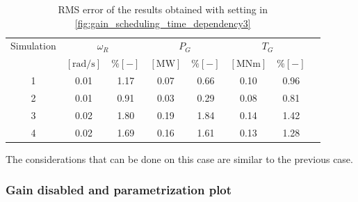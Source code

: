 \begin{table}[htb]
  \caption{RMS error of the results obtained with setting in \autoref{fig:gain_scheduling_time_dependency3}}
  \centering
  \begin{tabular}{cccccccc}
    \toprule
      Simulation & \multicolumn{2}{c}{$\omega_R$} & \multicolumn{2}{c}{$P_G$} & \multicolumn{2}{c}{$T_G$} \\ 
       & $\left[\si{\radian\per\second}\right]$ & $ \% \left[-\right]$ & $\left[\si{\mega\watt}\right]$ & $ \% \left[-\right]$ & $\left[\si{\mega\newton\meter} \right]$ & $ \% \left[-\right]$ \\ \midrule        
     1 & 0.01 &  1.17 &  0.07  &  0.66  &  0.10  &  0.96  \\
     2 & 0.01 &  0.91 &  0.03  &  0.29  &  0.08  &  0.81  \\
     3 & 0.02 &  1.80 &  0.19  &  1.84  &  0.14  &  1.42  \\
     4 & 0.02 &  1.69 &  0.16  &  1.61  &  0.13  &  1.28 \\ 
    
     \bottomrule
  \end{tabular}
  \label{tab:res_variable_gains3}
\end{table}

The considerations that can be done on this case are similar to the previous case. 

\subsubsection{Gain disabled and parametrization plot}

